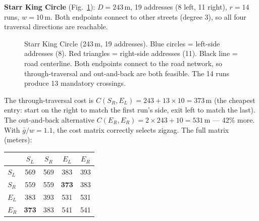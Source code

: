 \documentclass[conference]{IEEEtran}
\begin{document}
\textbf{Starr King Circle} (Fig.~\ref{fig:diag-subseg}): $D = 243$\,m, 19 addresses (8 left, 11 right), $r = 14$ runs, $w = 10$\,m. Both endpoints connect to other streets (degree 3), so all four traversal directions are reachable.

\begin{figure}[htbp]
\centering
{}
\caption{Starr King Circle (243\,m, 19 addresses). Blue circles = left-side addresses (8). Red triangles = right-side addresses (11). Black line = road centerline. Both endpoints connect to the road network, so through-traversal and out-and-back are both feasible. The 14 runs produce 13 mandatory crossings.}
\label{fig:diag-subseg}
\end{figure}

The through-traversal cost is $C(S_R, E_L) = 243 + 13 \times 10 = 373$\,m (the cheapest entry: start on the right to match the first run's side, exit left to match the last). The out-and-back alternative $C(E_R, E_R) = 2 \times 243 + 10 = 531$\,m --- 42\% more. With $\bar{g}/w = 1.1$, the cost matrix correctly selects zigzag. The full matrix (meters):

\begin{center}
\begin{tabular}{l|cccc}
    & $S_L$ & $S_R$ & $E_L$ & $E_R$ \\
\hline
$S_L$  & 569  & 569  & 383  & 393 \\
$S_R$  & 559  & 559  & \textbf{373}  & 383 \\
$E_L$  & 383  & 393  & 531  & 531 \\
$E_R$  & \textbf{373}  & 383  & 541  & 541
\end{tabular}
\end{center}
\end{document}
